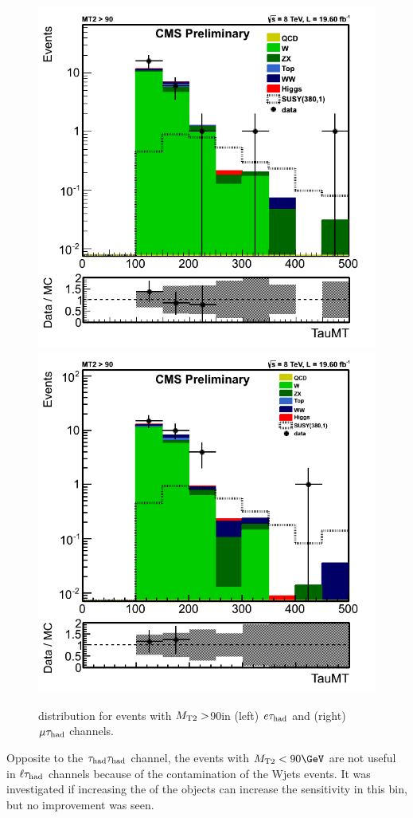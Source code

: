 \begin{figure}[!Hhtb]
\centering
\includegraphics[angle=0,scale=0.35]{SelectionEleTau/TauMT.png}
\includegraphics[angle=0,scale=0.35]{SelectionMuTau/tauMT_Ratio_MT2gt90_unBlinded.png}
\caption{\tauMT distribution for events with ${M_{\rm T2}}>$90\GeV in (left) $e\tau_{\rm had}$ and (right) $\mu\tau_{\rm had}$ channels.}
\label{fig:taumtleptontau}
\end{figure}
Opposite to the $\tau_{\rm had}\tau_{\rm had}$ channel, the events with $\mttwo<90 \GeV$ are not useful in $\ell\tau_{\rm had}$ channels because of the contamination of
the Wjets events. It was investigated if increasing the \pt of the objects can increase the sensitivity in this bin, but no improvement was seen.

